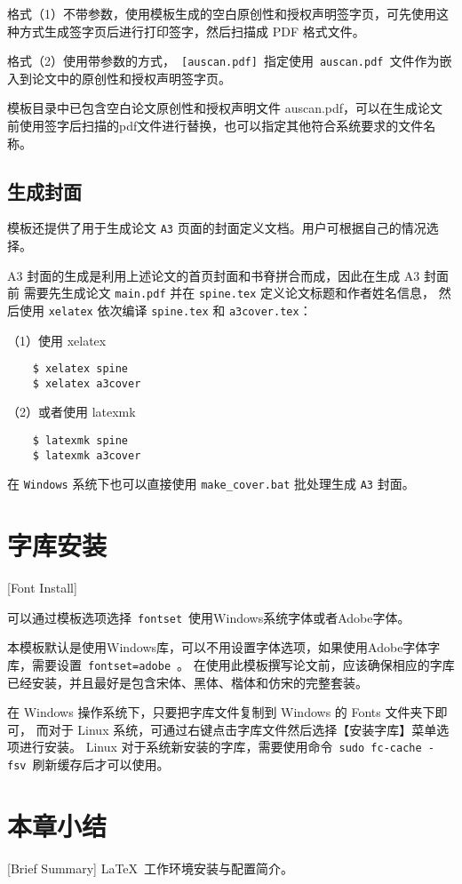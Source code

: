 格式（1）不带参数，使用模板生成的空白原创性和授权声明签字页，可先使用这种方式生成签字页后进行打印签字，然后扫描成 PDF 格式文件。

格式（2）使用带参数的方式，~\texttt{[auscan.pdf]}~指定使用~\texttt{auscan.pdf}~文件作为嵌入到论文中的原创性和授权声明签字页。

模板目录中已包含空白论文原创性和授权声明文件 auscan.pdf，可以在生成论文前使用签字后扫描的pdf文件进行替换，也可以指定其他符合系统要求的文件名称。

\subsection{生成封面}
\label{sec:generate-cover}

模板还提供了用于生成论文 \texttt{A3} 页面的封面定义文档。用户可根据自己的情况选择。

A3 封面的生成是利用上述论文的首页封面和书脊拼合而成，因此在生成 A3 封面前
需要先生成论文 \texttt{main.pdf} 并在 \texttt{spine.tex} 定义论文标题和作者姓名信息，
然后使用 \texttt{xelatex} 依次编译 \texttt{spine.tex} 和 \texttt{a3cover.tex}：

（1）使用 xelatex

\begin{lstlisting}
    $ xelatex spine
    $ xelatex a3cover
\end{lstlisting}

（2）或者使用 latexmk

\begin{lstlisting}
    $ latexmk spine
    $ latexmk a3cover
\end{lstlisting}

在 \texttt{Windows} 系统下也可以直接使用 \texttt{make\_cover.bat} 批处理生成 \texttt{A3} 封面。

\section{字库安装}[Font Install]

可以通过模板选项选择~\texttt{fontset}~使用Windows系统字体或者Adobe字体。

本模板默认是使用Windows库，可以不用设置字体选项，如果使用Adobe字体字库，需要设置~\texttt{fontset=adobe}~。
在使用此模板撰写论文前，应该确保相应的字库已经安装，并且最好是包含宋体、黑体、楷体和仿宋的完整套装。

在 Windows 操作系统下，只要把字库文件复制到 Windows 的 Fonts 文件夹下即可，
而对于 Linux 系统，可通过右键点击字库文件然后选择【安装字库】菜单选项进行安装。
Linux 对于系统新安装的字库，需要使用命令~\texttt{sudo fc-cache -fsv}~刷新缓存后才可以使用。

\section*{本章小结}[Brief Summary]
\LaTeX{}~工作环境安装与配置简介。
